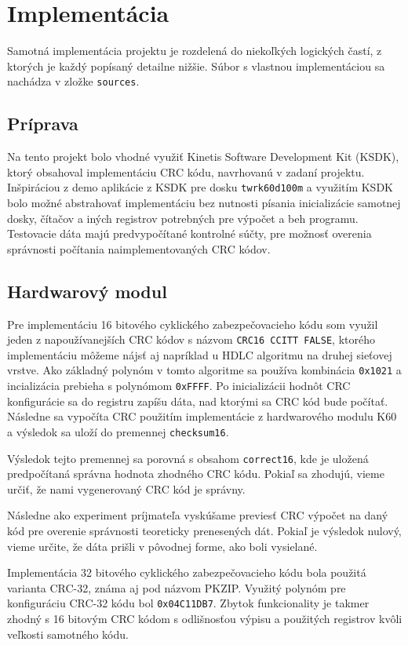 \documentclass[../projekt.tex]{subfiles}
\begin{document}
\chapter{Implementácia}
Samotná implementácia projektu je rozdelená do niekoľkých logických častí, z ktorých je každý popísaný detailne nižšie. Súbor s vlastnou implementáciou sa nachádza v zložke \texttt{sources}.


\section{Príprava}
Na tento projekt bolo vhodné využiť Kinetis Software Development Kit (KSDK)\cite{ksdk}, ktorý obsahoval implementáciu CRC kódu, navrhovanú v zadaní projektu. Inšpiráciou z demo aplikácie z KSDK pre dosku \texttt{twrk60d100m} a využitím KSDK bolo možné abstrahovať implementáciu bez nutnosti písania inicializácie samotnej dosky, čítačov a iných registrov potrebných pre výpočet a beh programu. Testovacie dáta majú predvypočítané kontrolné súčty, pre možnosť overenia správnosti počítania naimplementovaných CRC kódov.

\section{Hardwarový modul}
Pre implementáciu 16 bitového cyklického zabezpečovacieho kódu som využil jeden z napoužívanejších CRC kódov s názvom \texttt{CRC16 CCITT FALSE}\cite{16b}, ktorého implementáciu môžeme nájsť aj napríklad u HDLC algoritmu na druhej sieťovej vrstve. Ako základný polynóm v tomto algoritme sa používa kombinácia \texttt{0x1021} a incializácia prebieha s polynómom \texttt{0xFFFF}. Po inicializácii hodnôt CRC konfigurácie sa do registru zapíšu dáta, nad ktorými sa CRC kód bude počítať. Následne sa vypočíta CRC použitím implementácie z hardwarového modulu K60 a výsledok sa uloží do premennej \texttt{checksum16}. 

Výsledok tejto premennej sa porovná s obsahom \texttt{correct16}, kde je uložená predpočítaná správna hodnota zhodného CRC kódu. Pokiaľ sa zhodujú, vieme určiť, že nami vygenerovaný CRC kód je správny. 

Následne ako experiment príjmateľa vyskúšame previesť CRC výpočet na daný kód pre overenie správnosti teoreticky prenesených dát. Pokiaľ je výsledok nulový, vieme určite, že dáta prišli v pôvodnej forme, ako boli vysielané. 

Implementácia 32 bitového cyklického zabezpečovacieho kódu bola použitá varianta CRC-32\cite{32b}, známa aj pod názvom PKZIP. Využitý polynóm pre konfiguráciu CRC-32 kódu bol \texttt{0x04C11DB7}. Zbytok funkcionality je takmer zhodný s 16 bitovým CRC kódom s odlišnosťou výpisu a použitých registrov kvôli veľkosti samotného kódu.
\end{document}
